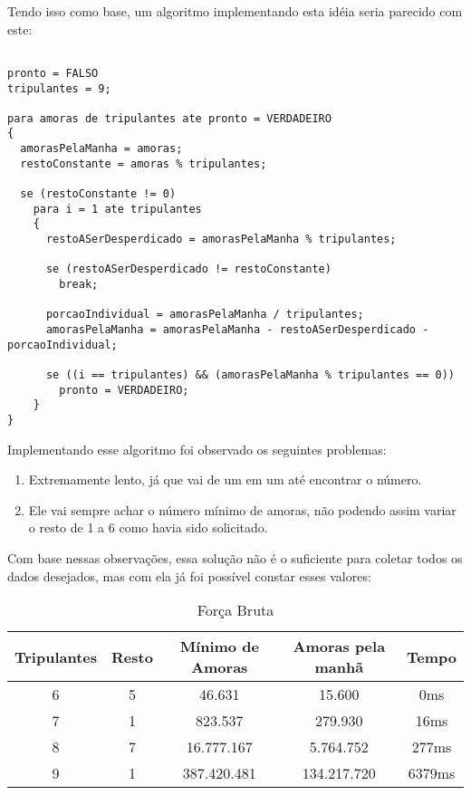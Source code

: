 \documentclass[12pt]{article}
\begin{document}
Tendo isso como base, um algoritmo implementando esta idéia seria parecido com este:

\begin{lstlisting}

pronto = FALSO
tripulantes = 9;

para amoras de tripulantes ate pronto = VERDADEIRO
{
  amorasPelaManha = amoras;
  restoConstante = amoras % tripulantes;

  se (restoConstante != 0)
    para i = 1 ate tripulantes
    {
      restoASerDesperdicado = amorasPelaManha % tripulantes;

      se (restoASerDesperdicado != restoConstante)
        break;

      porcaoIndividual = amorasPelaManha / tripulantes;
      amorasPelaManha = amorasPelaManha - restoASerDesperdicado - porcaoIndividual;

      se ((i == tripulantes) && (amorasPelaManha % tripulantes == 0))
        pronto = VERDADEIRO;
    }
}

\end{lstlisting}

Implementando esse algoritmo foi observado os seguintes problemas:

\begin{enumerate}

\item Extremamente lento, já que vai de um em um até encontrar o número.

\item Ele vai sempre achar o número mínimo de amoras, não podendo assim variar o resto de 1 a 6 como havia sido solicitado.

\end{enumerate}

Com base nessas observações, essa solução não é o suficiente para coletar todos os dados desejados, mas com ela já foi possível constar esses valores:

\vspace{0.5cm}

\begin{table}[H]

\centering

\begin{tabular}{|c|c|c|c|c|}

\hline
Tripulantes & Resto & Mínimo de Amoras & Amoras pela manhã & Tempo \\
\hline
6 & 5 & 46.631 & 15.600 & 0ms \\
\hline
7 & 1 & 823.537 & 279.930 & 16ms \\
\hline
8 & 7 & 16.777.167 & 5.764.752 & 277ms \\
\hline
9 & 1 & 387.420.481 & 134.217.720 & 6379ms \\
\hline

\end{tabular}
\label{Tabela1}
\caption{Força Bruta}

\end{table}
\end{document}
